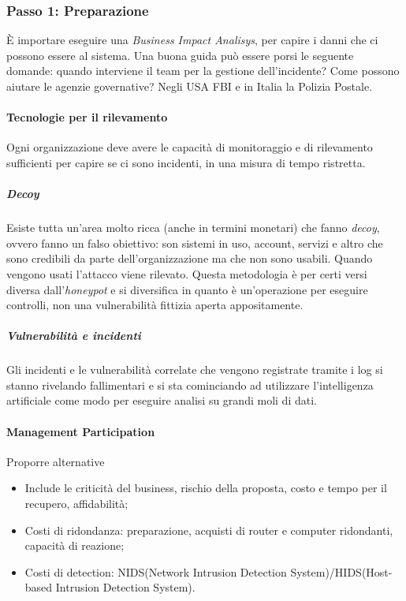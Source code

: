 \subsubsection{Passo 1: Preparazione}

È importare eseguire una \textit{Business Impact Analisys}, per capire i danni
che ci possono essere al sistema.
Una buona guida può essere porsi le seguente domande: quando interviene il team 
per la gestione dell'incidente? Come possono aiutare le agenzie governative? 
Negli USA FBI e in Italia la Polizia Postale.

\paragraph{Tecnologie per il rilevamento}

Ogni organizzazione deve avere le capacità di monitoraggio e di rilevamento
sufficienti per capire se ci sono incidenti, in una misura di tempo ristretta.

\subparagraph*{Decoy} Esiste tutta un'area molto ricca (anche in termini
monetari) che fanno \textit{decoy}, ovvero fanno un falso obiettivo: son sistemi
in uso, account, servizi e altro che sono credibili da parte dell'organizzazione
ma che non sono usabili. Quando vengono usati l'attacco viene rilevato. Questa 
metodologia è per certi versi diversa dall'\textit{honeypot} e si diversifica 
in quanto è un'operazione per eseguire controlli, non una vulnerabilità fittizia 
aperta appositamente.

\subparagraph*{Vulnerabilità e incidenti} Gli incidenti e le vulnerabilità
correlate che vengono registrate tramite i log si stanno rivelando fallimentari 
e si sta cominciando ad utilizzare l'intelligenza artificiale come modo per eseguire
analisi su grandi moli di dati.

\paragraph*{Management Participation}

Proporre alternative
\begin{itemize}
\item Include le criticità del business, rischio della proposta, costo e tempo
per il recupero, affidabilità;
\item Costi di ridondanza: preparazione, acquisti di router e computer ridondanti, 
capacità di reazione;
\item Costi di detection: NIDS(Network Intrusion Detection System)/HIDS(Host-based 
Intrusion Detection System).
\end{itemize}

